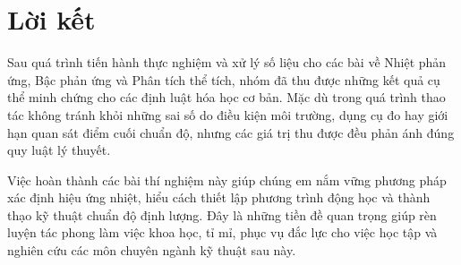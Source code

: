 \chapter*{Lời kết}

Sau quá trình tiến hành thực nghiệm và xử lý số liệu cho các bài về Nhiệt phản ứng, Bậc phản ứng và Phân tích thể tích, nhóm đã thu được những kết quả cụ thể minh chứng cho các định luật hóa học cơ bản. Mặc dù trong quá trình thao tác không tránh khỏi những sai số do điều kiện môi trường, dụng cụ đo hay giới hạn quan sát điểm cuối chuẩn độ, nhưng các giá trị thu được đều phản ánh đúng quy luật lý thuyết.

Việc hoàn thành các bài thí nghiệm này giúp chúng em nắm vững phương pháp xác định hiệu ứng nhiệt, hiểu cách thiết lập phương trình động học và thành thạo kỹ thuật chuẩn độ định lượng. Đây là những tiền đề quan trọng giúp rèn luyện tác phong làm việc khoa học, tỉ mỉ, phục vụ đắc lực cho việc học tập và nghiên cứu các môn chuyên ngành kỹ thuật sau này.